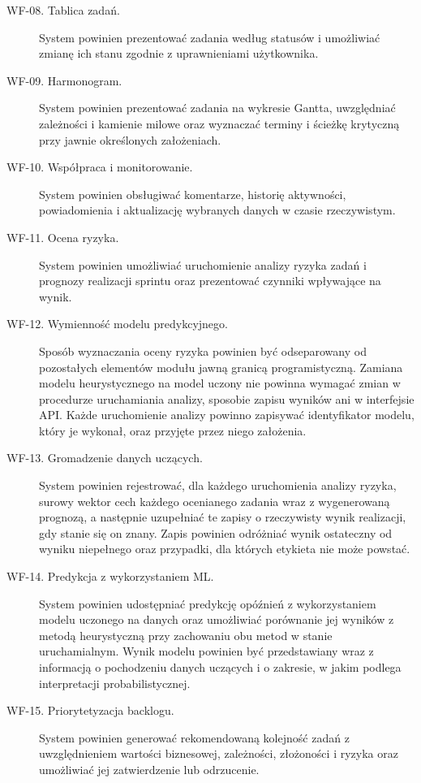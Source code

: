 \begin{description}
    \item[WF-08. Tablica zadań.]
    System powinien prezentować zadania według statusów i umożliwiać zmianę ich stanu zgodnie z uprawnieniami użytkownika.

    \item[WF-09. Harmonogram.]
    System powinien prezentować zadania na wykresie Gantta, uwzględniać zależności i kamienie milowe oraz wyznaczać terminy i ścieżkę krytyczną przy jawnie określonych założeniach.

    \item[WF-10. Współpraca i monitorowanie.]
    System powinien obsługiwać komentarze, historię aktywności, powiadomienia i aktualizację wybranych danych w czasie rzeczywistym.

    \item[WF-11. Ocena ryzyka.]
    System powinien umożliwiać uruchomienie analizy ryzyka zadań i prognozy realizacji sprintu oraz prezentować czynniki wpływające na wynik.

    \item[WF-12. Wymienność modelu predykcyjnego.]
    Sposób wyznaczania oceny ryzyka powinien być odseparowany od pozostałych elementów modułu jawną granicą programistyczną. Zamiana modelu heurystycznego na model uczony nie powinna wymagać zmian w procedurze uruchamiania analizy, sposobie zapisu wyników ani w interfejsie API. Każde uruchomienie analizy powinno zapisywać identyfikator modelu, który je wykonał, oraz przyjęte przez niego założenia.

    \item[WF-13. Gromadzenie danych uczących.]
    System powinien rejestrować, dla każdego uruchomienia analizy ryzyka, surowy wektor cech każdego ocenianego zadania wraz z wygenerowaną prognozą, a następnie uzupełniać te zapisy o rzeczywisty wynik realizacji, gdy stanie się on znany. Zapis powinien odróżniać wynik ostateczny od wyniku niepełnego oraz przypadki, dla których etykieta nie może powstać.

    \item[WF-14. Predykcja z wykorzystaniem ML.]
    System powinien udostępniać predykcję opóźnień z wykorzystaniem modelu uczonego na danych oraz umożliwiać porównanie jej wyników z metodą heurystyczną przy zachowaniu obu metod w stanie uruchamialnym. Wynik modelu powinien być przedstawiany wraz z informacją o pochodzeniu danych uczących i o zakresie, w jakim podlega interpretacji probabilistycznej.

    \item[WF-15. Priorytetyzacja backlogu.]
    System powinien generować rekomendowaną kolejność zadań z uwzględnieniem wartości biznesowej, zależności, złożoności i ryzyka oraz umożliwiać jej zatwierdzenie lub odrzucenie.


\end{description}
